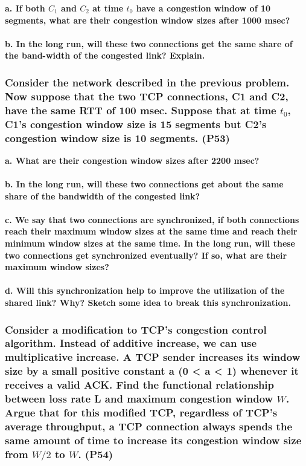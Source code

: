 \textbf{a. If both $C_1$ and $C_2$ at time $t_0$ have a congestion window of 10 segments, what are their congestion window sizes after 1000 msec?} \\
\\
\textbf{b. In the long run, will these two connections get the same share of the band-width of the congested link? Explain.}


\subsubsection{Consider the network described in the previous problem. Now suppose that the two TCP connections, C1 and C2, have the same RTT of 100 msec.  Suppose that at time $t_0$, C1's congestion window size is 15 segments but C2's congestion window size is 10 segments. (P53)}

\textbf{a. What are their congestion window sizes after 2200 msec?} \\
\\
\textbf{b. In the long run, will these two connections get about the same share of the bandwidth of the congested link?} \\
\\
\textbf{c. We say that two connections are synchronized, if both connections reach their maximum window sizes at the same time and reach their minimum window sizes at the same time. In the long run, will these two connections get synchronized eventually? If so, what are their maximum window sizes?} \\
\\
\textbf{d. Will this synchronization help to improve the utilization of the shared link? Why? Sketch some idea to break this synchronization.} \\


\subsubsection{Consider a modification to TCP's congestion control algorithm. Instead of additive increase, we can use multiplicative increase. A TCP sender increases its window size by a small positive constant a (0 < a < 1) whenever it receives a valid ACK. Find the functional relationship between loss rate L and maximum congestion window $W$. Argue that for this modified TCP, regardless of TCP's average throughput, a TCP connection always spends the same amount of time to increase its congestion window size from $W/2$ to $W$. (P54)}


